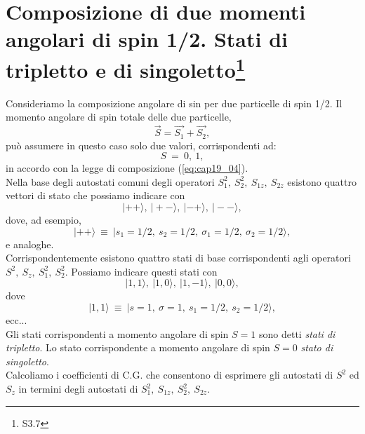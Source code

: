 \documentclass[a4paper,12pt,oneside]{book}
\begin{document}
\section[Composizione di due momenti angolari di spin 1/2. Stati di tripletto e di singoletto]{Composizione di due momenti angolari di spin 1/2. Stati di tripletto e di singoletto\footnote{S3.7}}
Consideriamo la composizione angolare di sin per due particelle di spin 1/2. Il momento angolare di spin totale delle due particelle,
\begin{equation}
\vec{S} = \vec{S_1} + \vec{S_2} ,
\end{equation}
può assumere in questo caso solo due valori, corrispondenti ad:
\begin{equation}
S~= ~0, ~1 ,
\end{equation}
in accordo con la legge di composizione (\ref{eq:cap19_04}).\\
Nella base degli autostati comuni degli operatori $S_1^2 ,~ S_2^2, ~ S_{1z}, ~ S_{2z}$ esistono quattro vettori di stato che possiamo indicare con \\ 
\begin{equation}
|++\rangle ,~ |+-\rangle,~ |-+\rangle , ~|--\rangle  ,
\end{equation}
dove, ad esempio, \\
\begin{equation}
|++\rangle~ \equiv ~|s_1=1/2, ~s_2=1/2,~\sigma_1 = 1/2, ~\sigma_2 = 1/2\rangle ,
\end{equation}
e analoghe. \\
Corrispondentemente esistono quattro stati di base corrispondenti agli operatori $S^2 ,~ S_z, ~ S_1^2, ~ S_2^2$. Possiamo indicare questi stati con \\
\begin{equation}
|1,1\rangle, ~|1,0\rangle, ~|1,-1\rangle, ~|0,0\rangle ,
\end{equation}dove \\
\begin{equation}
|1,1\rangle ~\equiv~ |s=1, ~ \sigma=1, ~s_1=1/2, ~s_2=1/2\rangle ,
\end{equation}
ecc... \\
Gli stati corrispondenti a momento angolare di spin $S=1$ sono detti \emph{stati di tripletto}. Lo stato corrispondente a momento angolare di spin $S=0$ \emph{stato di singoletto}. \\
Calcoliamo i coefficienti di C.G. che consentono di esprimere gli autostati di $S^2$ ed $S_z$ in termini degli autostati di $S_1^2 ,~ S_{1z}, ~ S_2^2, ~ S_{2z}$. \\
\end{document}
